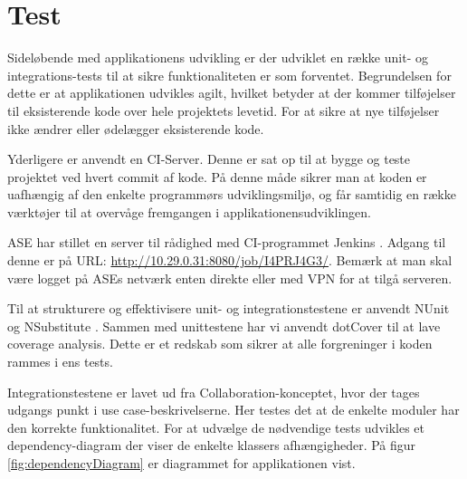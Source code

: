 \chapter{Test}
Sideløbende med applikationens udvikling er der udviklet en række unit- og integrations-tests til at sikre funktionaliteten er som forventet. Begrundelsen for dette er at applikationen udvikles agilt, hvilket betyder at der kommer tilføjelser til eksisterende kode over hele projektets levetid. For at sikre at nye tilføjelser ikke ændrer eller ødelægger eksisterende kode.

Yderligere er anvendt en CI-Server. Denne er sat op til at bygge og teste projektet ved hvert commit af kode. På denne måde sikrer man at koden er uafhængig af den enkelte programmørs udviklingsmiljø, og får samtidig en række værktøjer til at overvåge fremgangen i applikationensudviklingen.

ASE har stillet en server til rådighed med CI-programmet Jenkins \citep{jenkinsWeb}. Adgang til denne er på URL: \url{http://10.29.0.31:8080/job/I4PRJ4G3/}. Bemærk at man skal være logget på ASEs netværk enten direkte eller med VPN for at tilgå serveren.

Til at strukturere og effektivisere unit- og integrationstestene er anvendt NUnit \citep{nunitWeb} og NSubstitute \citep{nsubstituteWeb}. Sammen med unittestene har vi anvendt dotCover \citep{dotCoverWeb} til at lave coverage analysis. Dette er et redskab som sikrer at alle forgreninger i koden rammes i ens tests.

Integrationstestene er lavet ud fra Collaboration-konceptet, hvor der tages udgangs punkt i use case-beskrivelserne. Her testes det at de enkelte moduler har den korrekte funktionalitet.
For at udvælge de nødvendige tests udvikles et dependency-diagram der viser de enkelte klassers afhængigheder. På figur \ref{fig:dependencyDiagram} er diagrammet for applikationen vist.

